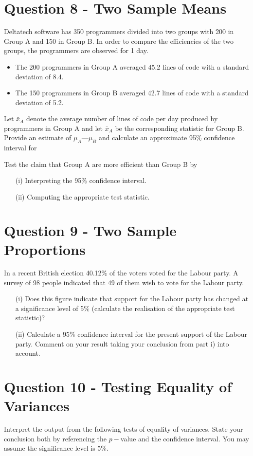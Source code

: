 \documentclass[a4paper,12pt]{article}
\begin{document}
\section*{Question 8 - Two Sample Means}
Deltatech software has 350 programmers divided into two groups with 200 in Group A
and 150 in Group B. In order to compare the efficiencies of the two groups, the
programmers are observed for 1 day.
\begin{itemize}
\item The 200 programmers in Group A averaged 45.2 lines of code with a standard
deviation of 8.4.
\item The 150 programmers in Group B averaged 42.7 lines of code with a standard
deviation of 5.2.
\end{itemize}
Let $\bar{x}_A$ denote the average number of lines of code per day produced by programmers in
Group A and
let $\bar{x}_A$ be the corresponding statistic for Group B.
Provide an estimate of $\mu_A —\mu_B$ and calculate an approximate 95\% confidence interval for

Test the claim that Group A are more efficient than Group B by
\begin{itemize}
\item[(i)] Interpreting the 95\% confidence interval.
\item[(ii)] Computing the appropriate test statistic.
\end{itemize}
\section*{Question 9 - Two Sample Proportions}
In a recent British election 40.12\% of the voters voted for the Labour party. A survey of 98 people indicated that 49 of them wish to vote for the Labour party. 
\begin{itemize}
\item[(i)] Does this figure indicate that support for the Labour party has changed at a significance level of 5\% (calculate the realisation of the appropriate test statistic)? 
\item[(ii)] Calculate a 95\% confidence interval for the present support of the Labour party. Comment on your result taking your conclusion from part i) into account. 
\end{itemize}


\newpage
\section*{Question 10 - Testing Equality of Variances}
Interpret the output from the following tests of equality of variances. State your conclusion both by referencing the $p-$value and the confidence interval. You may assume the significance level is 5\%.
\end{document}
